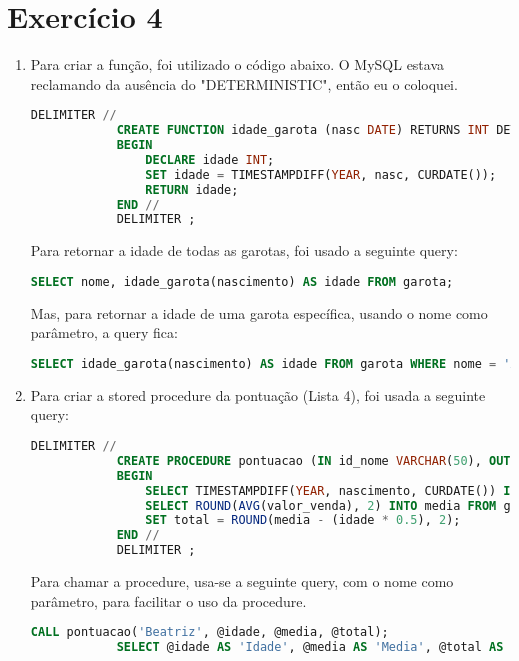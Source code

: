 \documentclass{article}
\begin{document}
\section*{Exercício 4}
    \begin{enumerate}[label=\alph*)]

        \item Para criar a função, foi utilizado o código abaixo. O MySQL estava reclamando da ausência do "DETERMINISTIC", então eu o coloquei.
        \begin{lstlisting}[language=SQL]
            DELIMITER //
            CREATE FUNCTION idade_garota (nasc DATE) RETURNS INT DETERMINISTIC
            BEGIN
                DECLARE idade INT;
                SET idade = TIMESTAMPDIFF(YEAR, nasc, CURDATE());
                RETURN idade;
            END //
            DELIMITER ;
        \end{lstlisting}

        Para retornar a idade de todas as garotas, foi usado a seguinte query:
        \begin{lstlisting}[language=SQL]
            SELECT nome, idade_garota(nascimento) AS idade FROM garota;
        \end{lstlisting}

        Mas, para retornar a idade de uma garota específica, usando o nome como parâmetro, a query fica:
        \begin{lstlisting}[language=SQL]
            SELECT idade_garota(nascimento) AS idade FROM garota WHERE nome = 'Ana'
        \end{lstlisting}

        \item Para criar a stored procedure da pontuação (Lista 4), foi usada a seguinte query:
        \begin{lstlisting}[language=SQL]
            DELIMITER //
            CREATE PROCEDURE pontuacao (IN id_nome VARCHAR(50), OUT idade INT, OUT media DECIMAL(10, 2), OUT total DECIMAL(10,2))
            BEGIN
                SELECT TIMESTAMPDIFF(YEAR, nascimento, CURDATE()) INTO idade FROM garota WHERE nome = id_nome; 
                SELECT ROUND(AVG(valor_venda), 2) INTO media FROM garota, vendas_biscoito WHERE garota.id_garota = vendas_biscoito.id_garota AND garota.nome = id_nome;
                SET total = ROUND(media - (idade * 0.5), 2);
            END //
            DELIMITER ;
        \end{lstlisting}

        Para chamar a procedure, usa-se a seguinte query, com o nome como parâmetro, para facilitar o uso da procedure.
        \begin{lstlisting}[language=SQL]
            CALL pontuacao('Beatriz', @idade, @media, @total);
            SELECT @idade AS 'Idade', @media AS 'Media', @total AS 'Pontuacao Total'; 
        \end{lstlisting}
        

    \end{enumerate}
\end{document}
